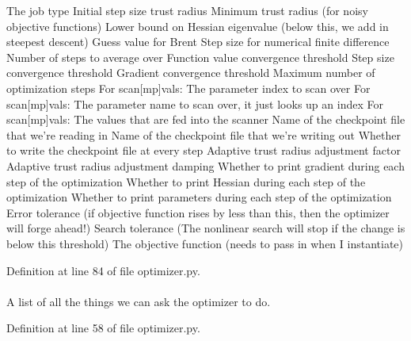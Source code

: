 \-The job type \-Initial step size trust radius \-Minimum trust radius (for noisy objective functions) \-Lower bound on \-Hessian eigenvalue (below this, we add in steepest descent) \-Guess value for \-Brent \-Step size for numerical finite difference \-Number of steps to average over \-Function value convergence threshold \-Step size convergence threshold \-Gradient convergence threshold \-Maximum number of optimization steps \-For scan\mbox{[}mp\mbox{]}vals\-: \-The parameter index to scan over \-For scan\mbox{[}mp\mbox{]}vals\-: \-The parameter name to scan over, it just looks up an index \-For scan\mbox{[}mp\mbox{]}vals\-: \-The values that are fed into the scanner \-Name of the checkpoint file that we're reading in \-Name of the checkpoint file that we're writing out \-Whether to write the checkpoint file at every step \-Adaptive trust radius adjustment factor \-Adaptive trust radius adjustment damping \-Whether to print gradient during each step of the optimization \-Whether to print \-Hessian during each step of the optimization \-Whether to print parameters during each step of the optimization \-Error tolerance (if objective function rises by less than this, then the optimizer will forge ahead!) \-Search tolerance (\-The nonlinear search will stop if the change is below this threshold) \-The objective function (needs to pass in when \-I instantiate) 

\-Definition at line 84 of file optimizer.\-py.

\hypertarget{classforcebalance_1_1optimizer_1_1Optimizer_acd9866c0bb48a8f49f2dca1d83441bde}{
\paragraph[{\-Opt\-Tab}]{}}\label{classforcebalance_1_1optimizer_1_1Optimizer_acd9866c0bb48a8f49f2dca1d83441bde}


\-A list of all the things we can ask the optimizer to do. 



\-Definition at line 58 of file optimizer.\-py.

\hypertarget{classforcebalance_1_1optimizer_1_1Optimizer_aaf7fba3e0abb466918f5954160e9cbd4}{
\paragraph[{\-Penalty}]{}}\label{classforcebalance_1_1optimizer_1_1Optimizer_aaf7fba3e0abb466918f5954160e9cbd4}


